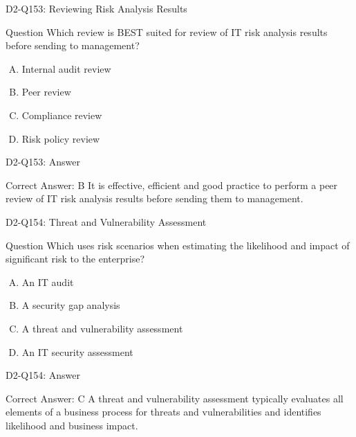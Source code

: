 \documentclass{beamer}
\begin{document}
	\begin{frame}{D2-Q153: Reviewing Risk Analysis Results}
		\begin{block}{Question}
			Which review is BEST suited for review of IT risk analysis results before sending to management?
		\end{block}
		\begin{enumerate}[(A)]
			\item Internal audit review
			\item Peer review
			\item Compliance review
			\item Risk policy review
		\end{enumerate}
	\end{frame}
	\begin{frame}{D2-Q153: Answer}
		\begin{block}{Correct Answer: B}
			It is effective, efficient and good practice to perform a peer review of IT risk analysis results before sending them to management.
		\end{block}
	\end{frame}
	
	\begin{frame}{D2-Q154: Threat and Vulnerability Assessment}
		\begin{block}{Question}
			Which uses risk scenarios when estimating the likelihood and impact of significant risk to the enterprise?
		\end{block}
		\begin{enumerate}[(A)]
			\item An IT audit
			\item A security gap analysis
			\item A threat and vulnerability assessment
			\item An IT security assessment
		\end{enumerate}
	\end{frame}
	\begin{frame}{D2-Q154: Answer}
		\begin{block}{Correct Answer: C}
			A threat and vulnerability assessment typically evaluates all elements of a business process for threats and vulnerabilities and identifies likelihood and business impact.
		\end{block}
	\end{frame}
	
\end{document}
